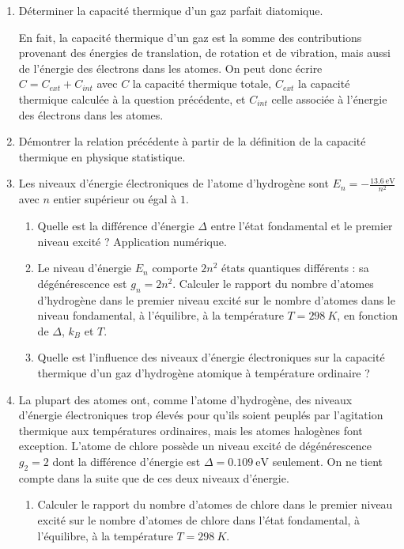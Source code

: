 \begin{enumerate}
	\item Déterminer la capacité thermique d'un gaz parfait diatomique.
	
	En fait, la capacité thermique d'un gaz est la somme des contributions provenant des énergies de translation, de rotation et de vibration, mais aussi de l'énergie des électrons dans les atomes. On peut donc écrire $C = C_{ext} + C_{int}$ avec $C$ la capacité thermique totale, $C_{ext}$ la capacité thermique calculée à la question précédente, et $C_{int}$ celle associée à l'énergie des électrons dans les atomes.
	
	\item Démontrer la relation précédente à partir de la définition de la capacité thermique en physique statistique.
	
	\item Les niveaux d'énergie électroniques de l'atome d'hydrogène sont $E_n = -\frac{\SI{13.6}{\electronvolt}}{n^2}$ avec $n$ entier supérieur ou égal à $1$. 
	\begin{enumerate}
		\item Quelle est la différence d'énergie $\Delta$ entre l'état fondamental et le premier niveau excité ? Application numérique.
		\item Le niveau d'énergie $E_n$ comporte $2 n^2$ états quantiques différents : sa dégénérescence est $g_n = 2n^2$. Calculer le rapport du nombre d'atomes d'hydrogène dans le premier niveau excité sur le nombre d'atomes dans le niveau fondamental, à l'équilibre, à la température $T = \SI{298}{K}$, en fonction de $\Delta$, $k_B$ et $T$.
		\item Quelle est l'influence des niveaux d'énergie électroniques sur la capacité thermique d'un gaz d'hydrogène atomique à température ordinaire ?
	\end{enumerate} 
	
	\item La plupart des atomes ont, comme l'atome d'hydrogène, des niveaux d'énergie électroniques trop élevés pour qu'ils soient peuplés par l'agitation thermique aux températures ordinaires, mais les atomes halogènes font exception. L'atome de chlore possède un niveau excité de dégénérescence $g_2 = 2$ dont la différence d'énergie est $\Delta = \SI{0.109}{\electronvolt}$ seulement. On ne tient compte dans la suite que de ces deux niveaux d'énergie.
	\begin{enumerate}
		\item Calculer le rapport du nombre d'atomes de chlore dans le premier niveau excité sur le nombre d'atomes de chlore dans l'état fondamental, à l'équilibre, à la température $T = \SI{298}{K}$.
		

\end{enumerate}
\end{enumerate}
